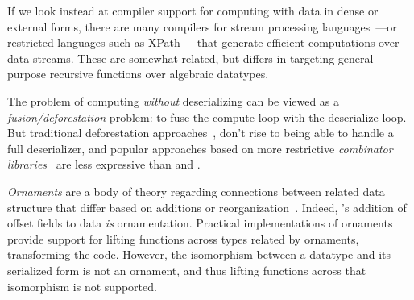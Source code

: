 If we look instead at compiler support for computing with data in dense or
external forms, there are many compilers for stream processing
languages~\cite{streamit,wavescript-nsdi}---or restricted languages such as
XPath~\cite{xpath-streams}---that generate efficient computations over data
streams.
These are somewhat related, but \ourcalc differs in targeting general
purpose recursive functions over algebraic datatypes.
%

The problem of computing \emph{without} deserializing can be viewed as a
\emph{{fusion/deforestation}} problem: to fuse the compute loop with the
deserialize loop.  But traditional deforestation
approaches~\cite{wadler-deforestation}, don't rise to being able to handle
a full deserializer, and popular approaches based on more restrictive {\em combinator
libraries}~\cite{stream-fusion} are less expressive than \lamadt and \ourcalc.

\emph{Ornaments} are a body of theory regarding connections between related
data structure that differ based on additions or
reorganization~\cite{ornaments}.
%
Indeed, \ourcalc's addition of offset fields to data {\em is} ornamentation.
%
Practical implementations of ornaments~\cite{ornament-ml} provide support for
lifting functions across types related by ornaments, transforming the code.
%
However, the isomorphism between a datatype and its serialized form is not an
ornament, and thus lifting functions across that isomorphism is not supported.



